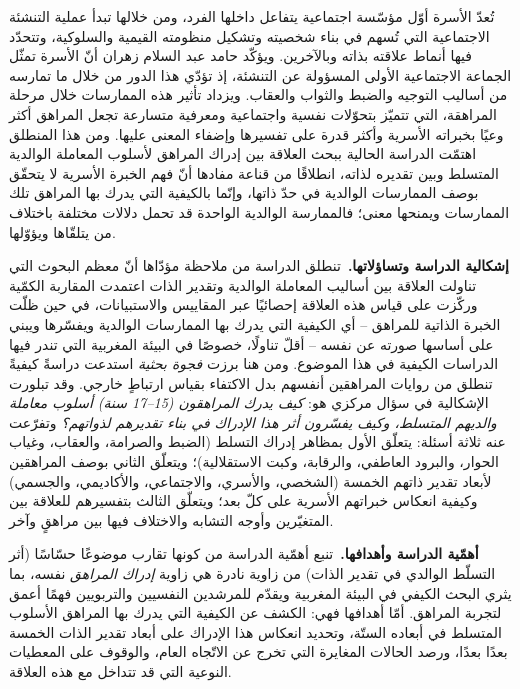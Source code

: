 \documentclass[12pt,oneside]{report}
\begin{document}
تُعدّ الأسرة أوّل مؤسّسة اجتماعية يتفاعل داخلها الفرد، ومن خلالها تبدأ عملية التنشئة الاجتماعية
التي تُسهم في بناء شخصيته وتشكيل منظومته القيمية والسلوكية، وتتحدّد فيها أنماط علاقته بذاته
وبالآخرين. ويؤكّد حامد عبد السلام زهران أنّ الأسرة تمثّل الجماعة الاجتماعية الأولى المسؤولة عن
التنشئة، إذ تؤدّي هذا الدور من خلال ما تمارسه من أساليب التوجيه والضبط والثواب والعقاب. ويزداد
تأثير هذه الممارسات خلال مرحلة المراهقة، التي تتميّز بتحوّلات نفسية واجتماعية ومعرفية متسارعة
تجعل المراهق أكثر وعيًا بخبراته الأسرية وأكثر قدرة على تفسيرها وإضفاء المعنى عليها. ومن هذا
المنطلق اهتمّت الدراسة الحالية ببحث العلاقة بين إدراك المراهق لأسلوب المعاملة الوالدية المتسلط
وبين تقديره لذاته، انطلاقًا من قناعة مفادها أنّ فهم الخبرة الأسرية لا يتحقّق بوصف الممارسات
الوالدية في حدّ ذاتها، وإنّما بالكيفية التي يدرك بها المراهق تلك الممارسات ويمنحها معنى؛ فالممارسة
الوالدية الواحدة قد تحمل دلالات مختلفة باختلاف من يتلقّاها ويؤوّلها.

\medskip
\noindent\textbf{إشكالية الدراسة وتساؤلاتها.}\ تنطلق الدراسة من ملاحظة مؤدّاها أنّ معظم البحوث
التي تناولت العلاقة بين أساليب المعاملة الوالدية وتقدير الذات اعتمدت المقاربة الكمّية وركّزت على
قياس هذه العلاقة إحصائيًا عبر المقاييس والاستبيانات، في حين ظلّت الخبرة الذاتية للمراهق -- أي
الكيفية التي يدرك بها الممارسات الوالدية ويفسّرها ويبني على أساسها صورته عن نفسه -- أقلّ تناولًا،
خصوصًا في البيئة المغربية التي تندر فيها الدراسات الكيفية في هذا الموضوع. ومن هنا برزت \emph{فجوة
بحثية} استدعت دراسةً كيفيةً تنطلق من روايات المراهقين أنفسهم بدل الاكتفاء بقياس ارتباطٍ خارجي.
وقد تبلورت الإشكالية في سؤال مركزي هو: \emph{كيف يدرك المراهقون (15--17 سنة) أسلوب معاملة والديهم
المتسلط، وكيف يفسّرون أثر هذا الإدراك في بناء تقديرهم لذواتهم؟} وتفرّعت عنه ثلاثة أسئلة: يتعلّق
الأول بمظاهر إدراك التسلط (الضبط والصرامة، والعقاب، وغياب الحوار، والبرود العاطفي، والرقابة، وكبت
الاستقلالية)؛ ويتعلّق الثاني بوصف المراهقين لأبعاد تقدير ذاتهم الخمسة (الشخصي، والأسري،
والاجتماعي، والأكاديمي، والجسمي) وكيفية انعكاس خبراتهم الأسرية على كلّ بعد؛ ويتعلّق الثالث
بتفسيرهم للعلاقة بين المتغيّرين وأوجه التشابه والاختلاف فيها بين مراهقٍ وآخر.

\medskip
\noindent\textbf{أهمّية الدراسة وأهدافها.}\ تنبع أهمّية الدراسة من كونها تقارب موضوعًا حسّاسًا
(أثر التسلّط الوالدي في تقدير الذات) من زاوية نادرة هي زاوية \emph{إدراك المراهق} نفسه، بما يثري
البحث الكيفي في البيئة المغربية ويقدّم للمرشدين النفسيين والتربويين فهمًا أعمق لتجربة المراهق.
أمّا أهدافها فهي: الكشف عن الكيفية التي يدرك بها المراهق الأسلوب المتسلط في أبعاده الستّة، وتحديد
انعكاس هذا الإدراك على أبعاد تقدير الذات الخمسة بعدًا بعدًا، ورصد الحالات المغايرة التي تخرج عن
الاتّجاه العام، والوقوف على المعطيات النوعية التي قد تتداخل مع هذه العلاقة.
\end{document}
